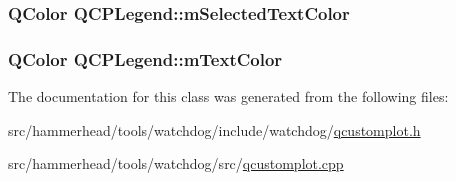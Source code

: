 \subsubsection[{\texorpdfstring{m\+Selected\+Text\+Color}{mSelectedTextColor}}]{\setlength{\rightskip}{0pt plus 5cm}Q\+Color Q\+C\+P\+Legend\+::m\+Selected\+Text\+Color\hspace{0.3cm}{\ttfamily [protected]}}\hypertarget{classQCPLegend_a6c25c8796c6e73e983aae6024965f2be}{}\label{classQCPLegend_a6c25c8796c6e73e983aae6024965f2be}
\subsubsection[{\texorpdfstring{m\+Text\+Color}{mTextColor}}]{\setlength{\rightskip}{0pt plus 5cm}Q\+Color Q\+C\+P\+Legend\+::m\+Text\+Color\hspace{0.3cm}{\ttfamily [protected]}}\hypertarget{classQCPLegend_a478b2d809a7390e9ff8f8bb70d6bd9fe}{}\label{classQCPLegend_a478b2d809a7390e9ff8f8bb70d6bd9fe}


The documentation for this class was generated from the following files\+:\begin{DoxyCompactItemize}
\item 
src/hammerhead/tools/watchdog/include/watchdog/\hyperlink{qcustomplot_8h}{qcustomplot.\+h}\item 
src/hammerhead/tools/watchdog/src/\hyperlink{qcustomplot_8cpp}{qcustomplot.\+cpp}\end{DoxyCompactItemize}
